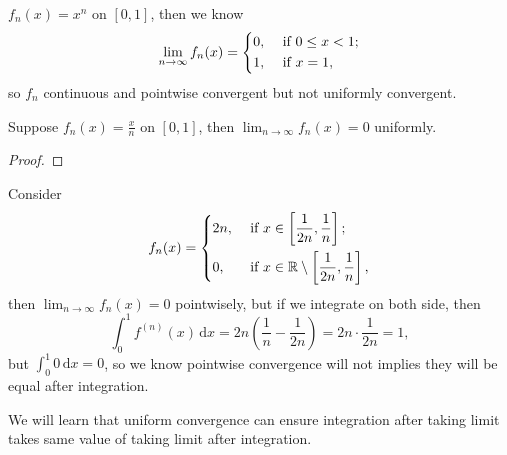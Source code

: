 \begin{eg}
    \(f_n(x) = x^n\) on \([0, 1]\), then we know
    \[
        \lim_{n \to \infty} f_n(x) = \begin{dcases}
            0, &\text{ if } 0 \le x < 1 ;\\
            1, &\text{ if } x = 1,
        \end{dcases} 
    \]  so \(f_n\) continuous and pointwise convergent but not uniformly convergent.  
\end{eg}

\begin{eg}
    Suppose \(f_n(x) = \frac{x}{n}\) on \([0, 1]\), then \(\lim_{n \to \infty} f_n(x) = 0 \) uniformly.    
\end{eg}
\begin{proof}
\end{proof}

\begin{eg}
    Consider 
    \[
        f_n(x) = \begin{dcases}
            2n, &\text{ if }  x \in \left[ \frac{1}{2n}, \frac{1}{n} \right] ;\\
            0, &\text{ if } x \in \mathbb{R} \setminus \left[ \frac{1}{2n}, \frac{1}{n} \right],
        \end{dcases}
    \] then \(\lim_{n \to \infty} f_n(x) = 0 \) pointwisely, but if we integrate on both side, then 
    \[
        \int _0^1 f^{(n)}(x) \, \mathrm{d} x = 2n \left( \frac{1}{n} - \frac{1}{2n} \right) = 2n \cdot \frac{1}{2n} = 1,  
    \] but \(\int _0^1 0 \, \mathrm{d} x = 0 \), so we know pointwise convergence will not implies they will be equal after integration. 
    \begin{remark}
        We will learn that uniform convergence can ensure integration after taking limit takes same value of taking limit after integration.
    \end{remark} 
\end{eg}